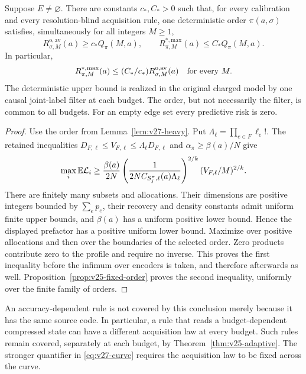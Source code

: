 \begin{theorem}\label{thm:v27-curve}
Suppose $E\ne\varnothing$. There are constants $c_*,C_*>0$ such that, for every calibration and every resolution-blind acquisition rule, one deterministic order $\pi(a,\sigma)$ satisfies, simultaneously for all integers $M\ge1$,
\begin{equation}\label{eq:v27-curve}
 R^{\mathrm{o,av}}_{\sigma,M}(a)\ge c_*Q_\pi(M,a),\qquad
 R^{*,\mathrm{max}}_{\pi,M}(a)\le C_*Q_\pi(M,a).
\end{equation}
In particular,
\[
 R^{*,\mathrm{max}}_{\pi,M}(a)
       \le (C_*/c_*)R^{\mathrm{o,av}}_{\sigma,M}(a)
                 \quad\hbox{for every }M.
\]
The deterministic upper bound is realized in the original charged model by one causal joint-label filter at each budget. The order, but not necessarily the filter, is common to all budgets. For an empty edge set every predictive risk is zero.
\end{theorem}
\begin{proof}
Use the order from Lemma~\ref{lem:v27-heavy}. Put $\Lambda_\ell=\prod_{e\in F}\ell_e!$. The retained inequalities $D_{F,\ell}\le V_{F,\ell}\le\Lambda_\ell D_{F,\ell}$ and $\alpha_\pi\ge\beta(a)/N$ give
\[
 \max_i\mathbb E\mathcal L_i\ge
 \frac{\beta(a)}{2N}
 \left(\frac{1}{2N C_{S_j^\pi,\ell}(a)\Lambda_\ell}\right)^{2/k}
                  (V_{F,\ell}/M)^{2/k}.
\]
There are finitely many subsets and allocations. Their dimensions are positive integers bounded by $\sum_ep_e$, their recovery and density constants admit uniform finite upper bounds, and $\beta(a)$ has a uniform positive lower bound. Hence the displayed prefactor has a positive uniform lower bound. Maximize over positive allocations and then over the boundaries of the selected order. Zero products contribute zero to the profile and require no inverse. This proves the first inequality before the infimum over encoders is taken, and therefore afterwards as well. Proposition~\ref{prop:v25-fixed-order} proves the second inequality, uniformly over the finite family of orders.
\end{proof}

An accuracy-dependent rule is not covered by this conclusion merely because it has the same source code. In particular, a rule that reads a budget-dependent compressed state can have a different acquisition law at every budget. Such rules remain covered, separately at each budget, by Theorem~\ref{thm:v25-adaptive}. The stronger quantifier in \eqref{eq:v27-curve} requires the acquisition law to be fixed across the curve.

